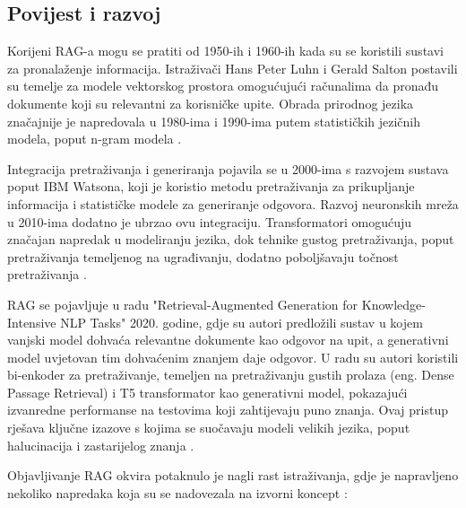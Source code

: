 \documentclass[]{foi}
\begin{document}
\subsection{Povijest i razvoj}

Korijeni RAG-a mogu se pratiti od 1950-ih i 1960-ih kada su se koristili sustavi za pronalaženje informacija. Istraživači Hans Peter Luhn i Gerald Salton postavili su temelje za modele
vektorskog prostora omogućujući računalima da pronađu dokumente koji su relevantni za korisničke upite. Obrada prirodnog jezika značajnije je napredovala u 1980-ima i 1990-ima putem
statističkih jezičnih modela, poput n-gram modela \cite{custom_ai_studio2025}. 

Integracija pretraživanja i generiranja pojavila se u 2000-ima s razvojem sustava poput IBM Watsona, koji je koristio metodu pretraživanja za prikupljanje informacija i statističke modele 
za generiranje odgovora. Razvoj neuronskih mreža u 2010-ima dodatno je ubrzao ovu integraciju. Transformatori omogućuju značajan napredak u modeliranju jezika, dok tehnike gustog pretraživanja,
poput pretraživanja temeljenog na ugrađivanju, dodatno poboljšavaju točnost pretraživanja \cite{custom_ai_studio2025}. 

RAG se pojavljuje u radu "Retrieval-Augmented Generation for Knowledge-Intensive NLP Tasks" 2020. godine, gdje su autori predložili sustav u kojem vanjski model dohvaća relevantne
dokumente kao odgovor na upit, a generativni model uvjetovan tim dohvaćenim znanjem daje odgovor. U radu su autori koristili bi-enkoder za pretraživanje, temeljen na pretraživanju gustih prolaza
(eng. Dense Passage Retrieval) i T5 transformator kao generativni model, pokazajući izvanredne performanse na testovima koji zahtijevaju puno znanja. 
Ovaj pristup rješava ključne izazove s kojima se suočavaju modeli velikih jezika, poput halucinacija i zastarijelog znanja \cite{custom_ai_studio2025}. 

Objavljivanje RAG okvira potaknulo je nagli rast istraživanja, gdje je napravljeno nekoliko napredaka koja su se nadovezala na izvorni koncept \cite{custom_ai_studio2025}:
\end{document}
